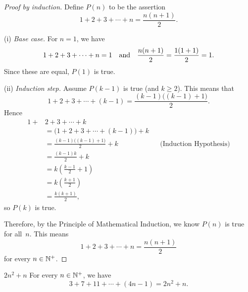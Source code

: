 \documentclass[../MATH-2000-Notes.tex]{subfiles}
\begin{document}
\begin{proof}[Proof by induction]
    Define $P(n)$ to be the assertion
    $$ 1 + 2 + 3 + \cdots + n = \frac{n(n+1)}{2} .$$

    (i) \emph{Base case.} For $n = 1$, we have
    $$1 + 2 + 3 + \cdots + n = 1 \mbox{\quad and\quad}  \frac{n(n+1)}{2}=\frac{1(1+1)}{2}=1.$$
    Since these are equal,
    $P(1)$ is true.

    \medbreak
    (ii) \emph{Induction step.} Assume $P(k-1)$ is true (and $k \ge 2$). This means that
    $$ 1 + 2 + 3 + \cdots + (k-1) = \frac{(k-1)\bigl( (k-1)+1\bigr)}{2} .$$
    Hence
    \begin{align*}
        1 + {} & 2 + 3 + \cdots + k
        \\&= \bigl(1 + 2 + 3 + \cdots + (k-1) \bigr) + k
        \\&= \frac{(k-1)\bigl( (k-1)+1\bigr)}{2} + k && \text{(Induction Hypothesis)}
        \\&= \frac{(k-1)k}{2} + k
        \\&= k \left( \frac{k-1}{2} + 1 \right)
        \\&= k \left( \frac{k+1}{2} \right)
        \\&= \frac{k (k+1)}{2}
        ,\end{align*}
    so $P(k)$ is true.

    Therefore, by the Principle of Mathematical Induction, we know $P(n)$ is true for all~$n$. This means
    $$ 1 + 2 + 3 + \cdots + n = \frac{n(n+1)}{2} $$
    for every $n \in \mathbb{N}^+$.
\end{proof}

\begin{Proposition}
    {\(2n^2 + n\)}
    For every $n \in \mathbb{N}^+$, we have
    $$ 3 + 7 + 11 + \cdots + (4n-1) = 2n^2 + n .$$
\end{Proposition}
\end{document}

